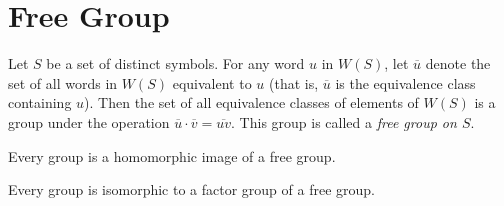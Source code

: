 \section{Free Group}

\begin{theorem}
	Let $S$ be a set of distinct symbols. For any word $u$ in $W(S)$, let $\overline{u}$ denote the set of all words in $W(S)$ equivalent to $u$ (that is, $\overline{u}$ is the equivalence class containing $u$). Then the set of all equivalence classes of elements of $W(S)$ is a group under the operation $\overline{u}\cdot\overline{v} = \overline{uv}$. This group is called a \textit{free group on $S$}.
\end{theorem}

\begin{theorem}
	Every group is a homomorphic image of a free group.
\end{theorem}

\begin{corollary}
	Every group is isomorphic to a factor group of a free group.
\end{corollary}
